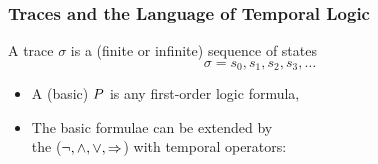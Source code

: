 \begin{frame}
  \frametitle{Traces and the Language of Temporal Logic}

  \begin{alertblock}{}
    A trace $\sigma$ is a (finite or infinite) sequence of states
    \[\sigma = s_0, s_1, s_2, s_3, \ldots\]
  \end{alertblock}

  \begin{itemize}
  \item A (basic)  $P$ is any
    \alert{first-order logic formula},
    \medskip
  \item The basic formulae can be extended by  \\
    \quad the  ($\neg, \land, \lor, \mathbin\Rightarrow$) with
    \alert{temporal operators}:
    \medskip
    \begin{center}
      
    \end{center}
    \begin{center}
      
    \end{center}
    \begin{center}
      
    \end{center}
  \end{itemize}
\end{frame}




\newcommand{\iI}{I}
\newcommand{\predP}{P}
\newcommand{\predQ}{Q}
\newcommand{\predR}{R}




